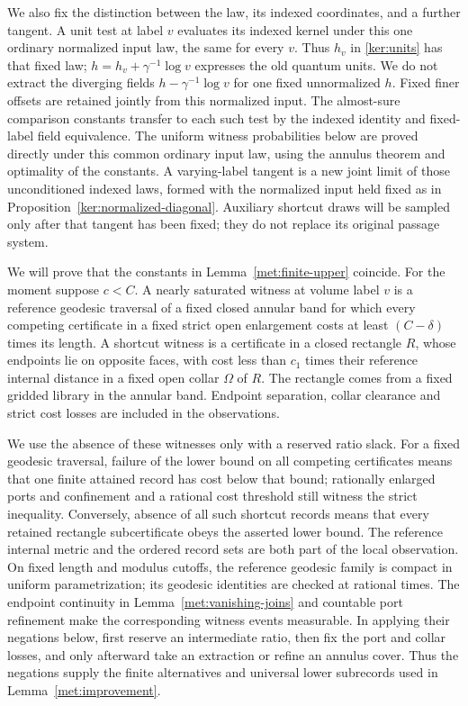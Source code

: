 \documentclass[11pt]{article}
\numberwithin{equation}{section}
\theoremstyle{definition}
\theoremstyle{remark}
\newcommand{\1}{\mathbf 1}
\begin{document}
We also fix the distinction between the law, its indexed coordinates,
and a further tangent.  A unit test at label $v$ evaluates its indexed
kernel under this one ordinary normalized input law, the same for
every $v$.  Thus $h_v$ in
\eqref{ker:units} has that fixed law; $h=h_v+\gamma^{-1}\log v$
expresses the old quantum units.  We do not extract the diverging
fields $h-\gamma^{-1}\log v$ for one fixed unnormalized $h$.
Fixed finer offsets are retained jointly from this normalized input.
The almost-sure comparison constants transfer to each such test by
the indexed identity and fixed-label field equivalence.  The uniform witness probabilities below are proved directly under
this common ordinary input law, using the annulus theorem and
optimality of the constants.  A varying-label tangent is a new joint
limit of those unconditioned indexed laws, formed with the normalized
input held fixed as in Proposition~\ref{ker:normalized-diagonal}.
Auxiliary shortcut draws will be sampled only after that tangent has
been fixed; they do not replace its original passage system.

We will prove that the constants in Lemma~\ref{met:finite-upper}
coincide.  For the moment suppose $c<C$.  A nearly saturated witness at
volume label $v$ is a reference geodesic traversal of a fixed closed
annular band for which every competing certificate in a fixed strict
open enlargement costs at least $(C-\delta)$ times its length.  A
shortcut witness is a certificate in a closed rectangle $R$, whose
endpoints lie on opposite faces, with cost less than $c_1$ times their
reference internal distance in a fixed open collar $\Omega$ of $R$.
The rectangle comes from a fixed gridded library in the annular band.
Endpoint separation, collar clearance and strict cost losses are
included in the observations.

We use the absence of these witnesses only with a reserved ratio
slack.  For a fixed geodesic traversal, failure of the lower bound on
all competing certificates means that one finite attained record has
cost below that bound; rationally enlarged ports and confinement and
a rational cost threshold still witness the strict inequality.
Conversely, absence of all such shortcut records means that every
retained rectangle subcertificate obeys the asserted lower bound.
The reference internal metric and the ordered record sets are both
part of the local observation.  On fixed length and modulus cutoffs,
the reference geodesic family is compact in uniform parametrization;
its geodesic identities are checked at rational times.  The endpoint
continuity in Lemma~\ref{met:vanishing-joins} and countable port
refinement make the corresponding witness events measurable.  In
applying their negations below, first reserve an intermediate ratio,
then fix the port and collar losses, and only afterward take an
extraction or refine an annulus cover.  Thus the negations supply the
finite alternatives and universal lower subrecords used in
Lemma~\ref{met:improvement}.
\end{document}
